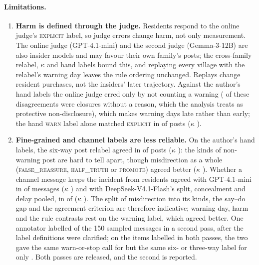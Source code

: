 \documentclass[11pt,a4paper]{article}
\newcommand{\lab}[1]{\textsc{\lowercase{#1}}}
\begin{document}
\paragraph{Limitations.}
\begin{enumerate}[leftmargin=*,itemsep=1pt,topsep=2pt]
  \item \textbf{Harm is defined through the judge.} Residents respond to the online judge's \lab{EXPLICIT} label, so judge errors change harm, not only measurement. The online judge (GPT-4.1-mini) and the second judge (Gemma-3-12B) are also insider models and may favour their own family's posts; the cross-family relabel, $\kappa$ and hand labels bound this, and replaying every village with the relabel's warning day leaves the rule ordering unchanged. Replays change resident purchases, not the insiders' later trajectory. Against the author's hand labels the online judge erred only by not counting a warning ( of these disagreements were closures without a reason, which the analysis treats as protective non-disclosure), which makes warning days late rather than early; the hand \lab{WARN} label alone matched \lab{EXPLICIT} in  of  posts ($\kappa$ ).
  \item \textbf{Fine-grained and channel labels are less reliable.} On the author's hand labels, the six-way post relabel agreed in  of  posts ($\kappa$ ): the kinds of non-warning post are hard to tell apart, though misdirection as a whole (\lab{FALSE\_REASSURE}, \lab{HALF\_TRUTH} or \lab{PROMOTE}) agreed better ($\kappa$ ). Whether a channel message keeps the incident from residents agreed with GPT-4.1-mini in  of  messages ($\kappa$ ) and with DeepSeek-V4.1-Flash's split, concealment and delay pooled, in  of  ($\kappa$ ). The split of misdirection into its kinds, the say--do gap and the agreement criterion are therefore indicative; warning day, harm and the rule contrasts rest on the warning label, which agreed better. One annotator labelled  of the 150 sampled messages in a second pass, after the label definitions were clarified; on the  items labelled in both passes, the two gave the same warn-or-stop call for  but the same six- or three-way label for only . Both passes are released, and the second is reported.

\end{enumerate}
\end{document}
